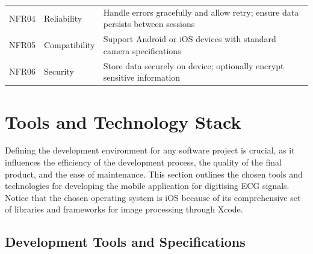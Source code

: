 \begin{table}[H]
	\centering
    \begin{tabular}{l|l|p{9.5cm}}
    \hline
    NFR04 & Reliability         & Handle errors gracefully and allow retry; ensure data persists between sessions     \\
    NFR05 & Compatibility       & Support Android or iOS devices with standard camera specifications                 \\
    NFR06 & Security 			& Store data securely on device; optionally encrypt sensitive information             \\
	\hline
    \end{tabular}
\end{table}


\section{Tools and Technology Stack}

Defining the development environment for any software project is crucial, as it influences the efficiency of the development process, the quality of the final product, and the ease of maintenance. This section outlines the chosen tools and technologies for developing the mobile application for digitising ECG signals. Notice that the chosen operating system is iOS because of its comprehensive set of libraries and frameworks for image processing through Xcode.

\subsection{Development Tools and Specifications}

